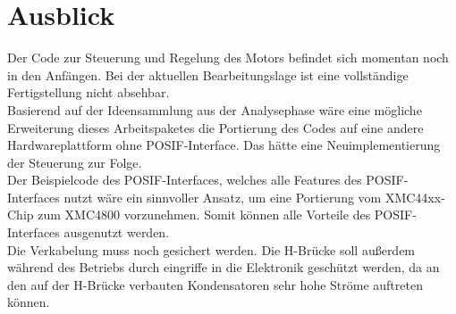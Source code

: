 \section{Ausblick}
Der Code zur Steuerung und Regelung des Motors befindet sich momentan noch in den Anfängen. Bei der aktuellen Bearbeitungslage ist eine vollständige Fertigstellung nicht absehbar. \\
Basierend auf der Ideensammlung aus der Analysephase wäre eine mögliche Erweiterung dieses Arbeitspaketes die Portierung des Codes auf eine andere Hardwareplattform ohne POSIF-Interface. Das hätte eine Neuimplementierung der Steuerung zur Folge. \\
Der Beispielcode des POSIF-Interfaces, welches alle Features des POSIF-Interfaces nutzt wäre ein sinnvoller Ansatz, um eine Portierung vom XMC44xx-Chip zum XMC4800 vorzunehmen. Somit können alle Vorteile des POSIF-Interfaces ausgenutzt werden. \\
Die Verkabelung muss noch gesichert werden. Die H-Brücke soll außerdem während des Betriebs durch eingriffe in die Elektronik geschützt werden, da an den auf der H-Brücke verbauten Kondensatoren sehr hohe Ströme auftreten können. 

